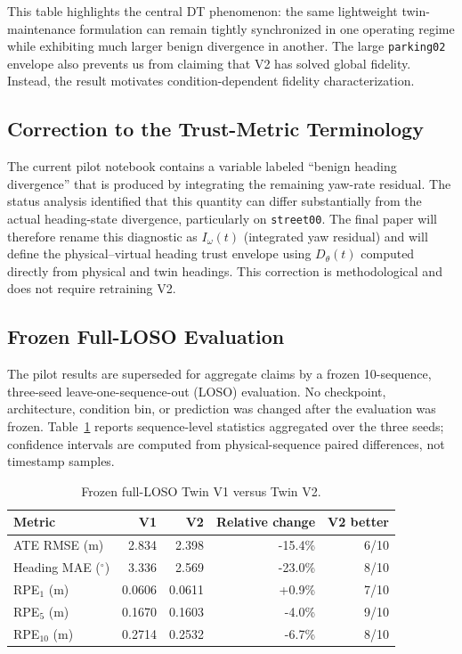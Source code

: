 \documentclass[conference]{IEEEtran}
\newcommand{\Dtheta}{D_{\theta}}
\newcommand{\Iomega}{I_{\omega}}
\begin{document}
This table highlights the central DT phenomenon: the same lightweight twin-maintenance formulation can remain tightly synchronized in one operating regime while exhibiting much larger benign divergence in another. The large \texttt{parking02} envelope also prevents us from claiming that V2 has solved global fidelity. Instead, the result motivates condition-dependent fidelity characterization.

\subsection{Correction to the Trust-Metric Terminology}
The current pilot notebook contains a variable labeled ``benign heading divergence'' that is produced by integrating the remaining yaw-rate residual. The status analysis identified that this quantity can differ substantially from the actual heading-state divergence, particularly on \texttt{street00}. The final paper will therefore rename this diagnostic as $\Iomega(t)$ (integrated yaw residual) and will define the physical--virtual heading trust envelope using $\Dtheta(t)$ computed directly from physical and twin headings. This correction is methodological and does not require retraining V2.

\subsection{Frozen Full-LOSO Evaluation}
The pilot results are superseded for aggregate claims by a frozen 10-sequence, three-seed leave-one-sequence-out (LOSO) evaluation. No checkpoint, architecture, condition bin, or prediction was changed after the evaluation was frozen. Table~\ref{tab:fullloso} reports sequence-level statistics aggregated over the three seeds; confidence intervals are computed from physical-sequence paired differences, not timestamp samples.

\begin{table}[t]
\centering
\caption{Frozen full-LOSO Twin V1 versus Twin V2.}
\label{tab:fullloso}
\footnotesize
\begin{tabular}{lrrrr}
\toprule
Metric & V1 & V2 & Relative change & V2 better \\
\midrule
ATE RMSE (m) & 2.834 & 2.398 & -15.4\% & 6/10 \\
Heading MAE ($^{\circ}$) & 3.336 & 2.569 & -23.0\% & 8/10 \\
RPE$_1$ (m) & 0.0606 & 0.0611 & +0.9\% & 7/10 \\
RPE$_5$ (m) & 0.1670 & 0.1603 & -4.0\% & 9/10 \\
RPE$_{10}$ (m) & 0.2714 & 0.2532 & -6.7\% & 8/10 \\
\bottomrule
\end{tabular}
\end{table}
\end{document}

